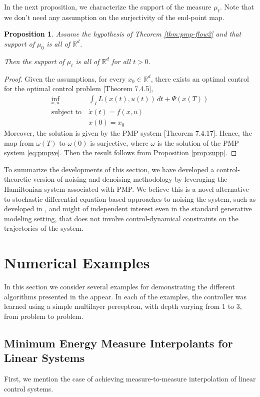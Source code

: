 \documentclass{article}
\newtheorem{proposition}[theorem]{Proposition}
\newcommand{\Rd}{\mathbb{R}^d}
\begin{document}
In the next proposition, we characterize the support of the measure $\mu_t$. Note that we don't need any assumption on the surjectivity of the end-point map.

\begin{proposition}
Assume the hypothesis of Theorem \ref{thm:pmp-flow2} and that support of $\mu_0$ is all of $\Rd$.  

Then the support of $\mu_t$ is all of $\Rd$ for all $t > 0$.
\end{proposition}
\begin{proof}
Given the assumptions, for every $x_0 \in \Rd$, there exists an optimal control for the optimal control problem \cite{cannarsa2008semiconcavity}[Theorem 7.4.5],
\begin{align}
\label{eq:nonlinear-optsec}
\inf_{x,u} & \int_I L(x(t),u(t)) \, dt + \Psi (x(T)) \\
\text{subject to} ~ & \dot{x}(t) = f(x,u) \\
& x(0) = x_0
\end{align}
Moreover, the solution is given by the PMP system \cite{cannarsa2008semiconcavity}[Theorem 7.4.17]. Hence, the map from $\omega(T)$ to $\omega(0)$ is surjective, where $\omega$ is the solution of the PMP system \eqref{eq:pmpve}. Then the result follows from Proposition \ref{prop:supp}.

\end{proof}

To summarize the developments of this section, we have developed a control-theoretic version of noising and denoising methodology by leveraging the Hamiltonian system associated with PMP. We believe this is a novel alternative to stochastic differential equation based approaches to noising the system, such as developed in \cite{song2020score}, and might of independent interest even in the standard generative modeling setting, that does not involve control-dynamical constraints on the trajectories of the system.

\section{Numerical Examples}
\label{sec:numexp}
In this section we consider several examples for demonstrating the different algorithms presented in the appear. In each of the examples, the controller was learned using a simple multilayer perceptron, with depth varying from $1$ to $3$, from problem to problem.
\subsection{Minimum Energy Measure Interpolants for Linear Systems}
First, we mention the case of achieving measure-to-measure interpolation of linear control systems.
\end{document}

